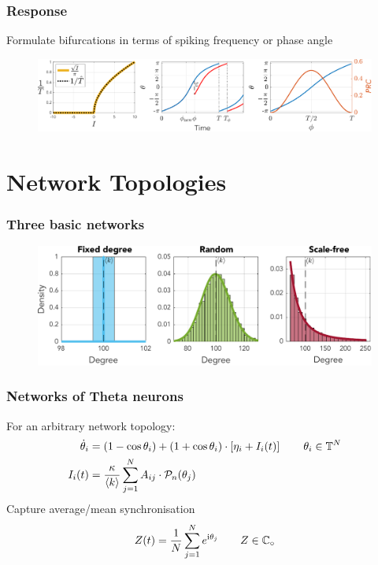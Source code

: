 \begin{frame}
\frametitle{Response}
\tabitem Formulate bifurcations in terms of spiking frequency or phase angle
\begin{figure}[H]
\centering
\includegraphics[width = \textwidth]{../Figures/ThetaNeuronfIandPRC.pdf}
\label{fig:ThetaNeuronfIandPRC}
\end{figure}
\end{frame}



\section{Network Topologies}
\begin{frame}
\frametitle{Three basic networks}
\begin{figure}[H]
\centering
\includegraphics[width = \textwidth]{../Figures/Distributions/1D.pdf}
\label{fig:1Dpdfs}
\end{figure}
\end{frame}

\begin{frame}
\frametitle{Networks of Theta neurons}
\tabitem For an arbitrary network topology:
\begin{align*}
\dot{\theta}_{i} &=\left(1-\cos \theta_{i}\right)+\left(1+\cos \theta_{i}\right) \cdot \left[\eta_{i} + I_{i}(t)\right] \qquad \theta_i \in {\mathbb{T}}^N \\
I_{i}(t) &=\frac{\kappa}{{\langle k\rangle}} \sum_{j=1}^{N} A_{i j} \cdot \mathcal{P}_{n}(\theta_{j}) 
\end{align*}
\tabitem Capture average/mean synchronisation 
\begin{align*}
Z(t) = \frac{1}{N} \sum_{j=1}^N e^{{\rm{i}}\theta_j}  \qquad Z \in \mathbb{C}_\circ 
\end{align*}
\end{frame}



